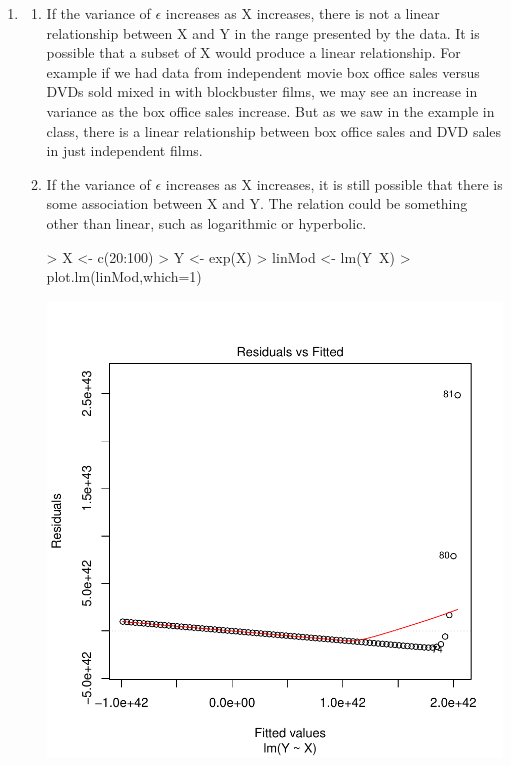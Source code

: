 \documentclass[]{article}
\begin{document}
\begin{enumerate}
\item

\begin{enumerate}
\item
If the variance of $\epsilon$ increases as X increases, there is not a linear relationship between X and Y in the range presented by the data. It is possible that a subset of X would produce a linear relationship. For example if we had data from independent movie box office sales versus DVDs sold mixed in with blockbuster films, we may see an increase in variance as the box office sales increase. But as we saw in the example in class, there is a linear relationship between box office sales and DVD sales in just independent films.

\item
If the variance of $\epsilon$ increases as X increases, it is still possible that there is some association between X and Y. The relation could be something other than linear, such as logarithmic or hyperbolic. 
\begin{Schunk}
\begin{Sinput}
> X <- c(20:100)
> Y <- exp(X)
> linMod <- lm(Y~X)
> plot.lm(linMod,which=1)
\end{Sinput}
\end{Schunk}
\includegraphics{Homework3-001}
\begin{Schunk}

\end{Schunk}
\end{enumerate}
\end{enumerate}
\end{document}
